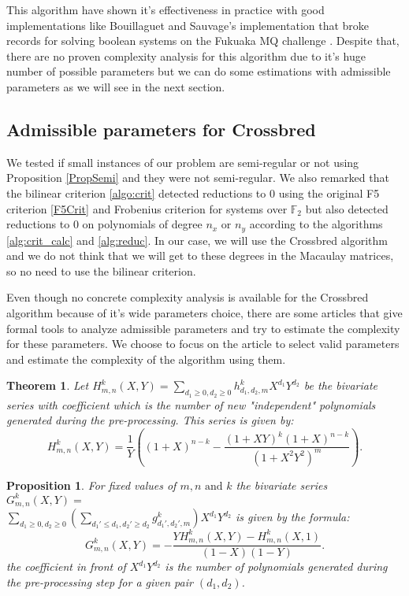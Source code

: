 \documentclass[english]{article}
\newtheorem{proposition}{Proposition}[section]
\newtheorem{theorem}{Theorem}[section]
\begin{document}
		This algorithm have shown it's effectiveness in practice with good implementations like Bouillaguet and Sauvage's implementation \cite {BS23} that broke records for solving boolean systems on the Fukuaka MQ challenge \cite{MQFUK}. Despite that, there are no proven complexity analysis for this algorithm due to it's huge number of possible parameters but we can do some estimations with admissible parameters as we will see in the next section.
		
	\subsection{Admissible parameters for Crossbred}
		We tested if small instances of our problem are semi-regular or not using Proposition \ref{PropSemi} and they were not semi-regular. We also remarked that the bilinear criterion \ref{algo:crit} detected reductions to 0 using the original F5 criterion \ref{F5Crit} and Frobenius criterion for systems over $\mathbb{F}_2$ but also detected reductions to 0 on polynomials of degree $n_x$ or $n_y$ according to the algorithms \ref{alg:crit_calc} and \ref{alg:reduc}. In our case, we will use the Crossbred algorithm and we do not think that we will get to these degrees in the Macaulay matrices, so no need to use the bilinear criterion.
		
		Even though no concrete complexity analysis is available for the Crossbred algorithm because of it's wide parameters choice, there are some articles that give formal tools to analyze admissible parameters and try to estimate the complexity for these parameters. We choose to focus on the article \cite{VID24} to select valid parameters and estimate the complexity of the algorithm using them.
		
		\begin{theorem}\label{serie_=H}
			Let $H_{m, n}^k(X,Y) = \sum_{d_1 \geq 0, d_2 \geq 0} h_{d_1, d_2, m}^k X^{d_1}Y^{d_2}$ be the bivariate series with coefficient which is the number of new "independent" polynomials generated during the pre-processing. This series is given by:
			$$
				H_{m, n}^k(X, Y) = \frac{1}{Y}\left((1+X)^{n-k} - \frac{(1+XY)^k(1+X)^{n-k}}{(1+X^2Y^2)^m}\right).
			$$
		\end{theorem}
		
		\begin{proposition}\label{serie_G}
			For fixed values of $m, n \text{ and } k$ the bivariate series $G^{k}_{m,n}(X, Y) = $ \\ $\sum_{d_1 \geq 0, d_2 \geq 0}(\sum_{d_{1}' \leq d_1, d_{2}' \geq d_2} g_{d_{1}',d_{2}',m}^k)X^{d_1}Y^{d_2}$ is given by the formula:
			$$
				G^{k}_{m,n}(X, Y) = - \frac{YH_{m, n}^k(X,Y) - H_{m, n}^k(X, 1)}{(1-X)(1-Y)}.
			$$
			the coefficient in front of $X^{d_1}Y^{d_2}$ is the number of polynomials generated during the pre-processing step for a given pair $(d_1, d_2)$.
		\end{proposition}
		
\end{document}
